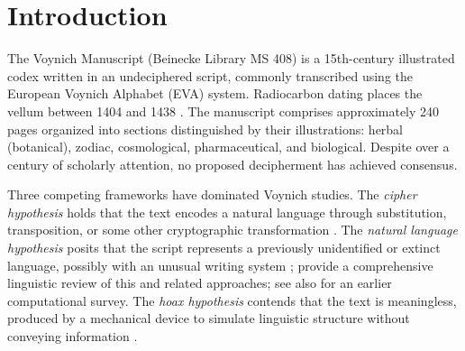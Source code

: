\documentclass[12pt]{article}
\begin{document}
\newpage

\section{Introduction}
\label{sec:intro}

The Voynich Manuscript (Beinecke Library MS 408) is a 15th-century illustrated codex written in an undeciphered script, commonly transcribed using the European Voynich Alphabet (EVA) system. Radiocarbon dating places the vellum between 1404 and 1438 \citep{Hodgins2011}. The manuscript comprises approximately 240 pages organized into sections distinguished by their illustrations: herbal (botanical), zodiac, cosmological, pharmaceutical, and biological. Despite over a century of scholarly attention, no proposed decipherment has achieved consensus.

Three competing frameworks have dominated Voynich studies. The \emph{cipher hypothesis} holds that the text encodes a natural language through substitution, transposition, or some other cryptographic transformation \citep{dImperio1978, Newbold1928}. The \emph{natural language hypothesis} posits that the script represents a previously unidentified or extinct language, possibly with an unusual writing system \citep{Bax2014}; \citet{Bowern2021} provide a comprehensive linguistic review of this and related approaches; see also \citet{Reddy2011} for an earlier computational survey. The \emph{hoax hypothesis} contends that the text is meaningless, produced by a mechanical device to simulate linguistic structure without conveying information \citep{Rugg2004, RuggTaylor2017, Schinner2007}.
\end{document}
